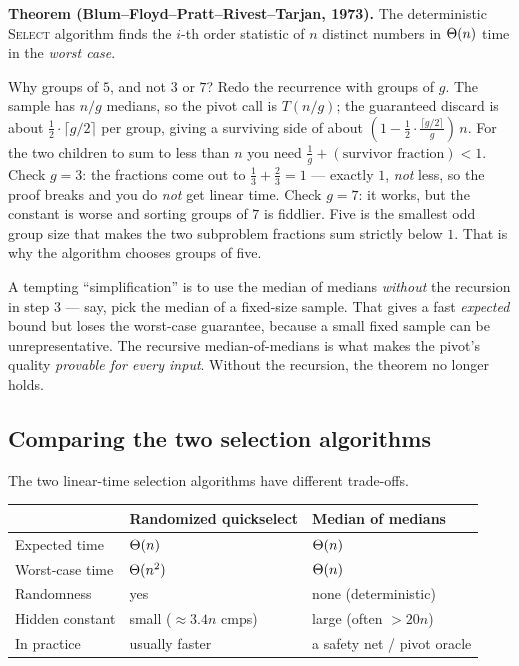 \begin{formalbox}
\textbf{Theorem (Blum--Floyd--Pratt--Rivest--Tarjan, 1973).} The deterministic
\textsc{Select} algorithm finds the $i$-th order statistic of $n$ distinct numbers
in $\Theta(n)$ time in the \emph{worst case}.
\end{formalbox}

\begin{walkbox}
Why groups of $5$, and not $3$ or $7$? Redo the recurrence with groups of $g$. The
sample has $n/g$ medians, so the pivot call is $T(n/g)$; the guaranteed discard is
about $\tfrac{1}{2}\cdot\lceil g/2\rceil$ per group, giving a surviving side of
about $(1 - \tfrac{1}{2}\cdot\tfrac{\lceil g/2\rceil}{g})\,n$. For the two
children to sum to less than $n$ you need $\tfrac{1}{g} + (\text{survivor
fraction}) < 1$. Check $g = 3$: the fractions come out to $\tfrac{1}{3} + \tfrac{2}{3}
= 1$ --- exactly $1$, \emph{not} less, so the proof breaks and you do \emph{not}
get linear time. Check $g = 7$: it works, but the constant is worse and sorting
groups of $7$ is fiddlier. Five is the smallest odd group size that makes the two
subproblem fractions sum strictly below $1$. That is why the algorithm chooses groups of five.
\end{walkbox}

\begin{trapbox}
A tempting ``simplification'' is to use the median of medians \emph{without} the
recursion in step 3 --- say, pick the median of a fixed-size sample. That gives a
fast \emph{expected} bound but loses the worst-case guarantee, because a small
fixed sample can be unrepresentative. The recursive median-of-medians is what makes
the pivot's quality \emph{provable for every input}. Without the recursion, the
theorem no longer holds.
\end{trapbox}

\subsection{Comparing the two selection algorithms}

The two linear-time selection algorithms have different trade-offs.

\begin{center}
\begin{tabular}{@{}lll@{}}
\toprule
 & \textbf{Randomized quickselect} & \textbf{Median of medians} \\
\midrule
Expected time      & $\Theta(n)$         & $\Theta(n)$ \\
Worst-case time    & $\Theta(n^2)$       & $\Theta(n)$ \\
Randomness         & yes              & none (deterministic) \\
Hidden constant    & small ($\approx 3.4n$ cmps) & large (often $> 20n$) \\
In practice        & usually faster   & a safety net / pivot oracle \\
\bottomrule
\end{tabular}
\end{center}

